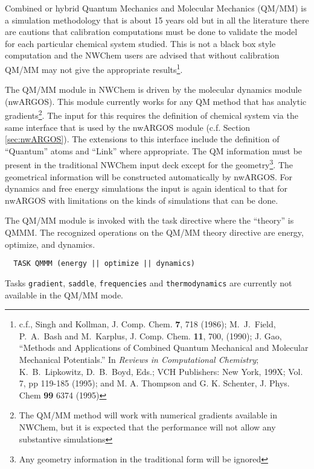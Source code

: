 
\label{sec:qmmm}

Combined or hybrid Quantum Mechanics and Molecular Mechanics (QM/MM)
is a simulation methodology that is about 15 years old but in all the
literature there are cautions that calibration computations must be
done to validate the model for each particular chemical system
studied.  This is not a black box style computation and the NWChem
users are advised that without calibration QM/MM may not give the
appropriate results\footnote{c.f., Singh and Kollman, J. Comp. Chem.
  {\bf 7}, 718 (1986); M.~J.~Field, P.~A.~Bash and M.~Karplus, J.
  Comp. Chem. {\bf 11}, 700, (1990); J. Gao, ``Methods and
  Applications of Combined Quantum Mechanical and Molecular Mechanical
  Potentials.'' In {\it Reviews in Computational Chemistry};
  K.~B.~Lipkowitz, D.~B.~Boyd, Eds.; VCH Publishers: New York, 199X;
  Vol. 7, pp 119-185 (1995); and M. A. Thompson and G. K. Schenter, J.
  Phys. Chem {\bf 99} 6374 (1995) }.

The QM/MM module in NWChem is driven by the molecular dynamics module
(nwARGOS).  This module currently works for any QM method that has
analytic gradients\footnote{The QM/MM method will work with numerical
  gradients available in NWChem, but it is expected that the
  performance will not allow any substantive simulations}.  The input
for this requires the definition of chemical system via the same
interface that is used by the nwARGOS module (c.f. Section
\ref{sec:nwARGOS}).  The extensions to this interface include the
definition of ``Quantum'' atoms and ``Link'' where appropriate.  The
QM information must be present in the traditional NWChem input deck
except for the geometry\footnote{Any geometry information in the
  traditional form will be ignored}.  The geometrical information will
be constructed automatically by nwARGOS.  For dynamics and free energy
simulations the input is again identical to that for nwARGOS with
limitations on the kinds of simulations that can be done.

The QM/MM module is invoked with the task directive where the
``theory'' is QMMM.  The recognized operations on the QM/MM theory
directive are energy, optimize, and dynamics.

\begin{verbatim}
  TASK QMMM (energy || optimize || dynamics)
\end{verbatim}

Tasks \verb+gradient+, \verb+saddle+, \verb+frequencies+ and
\verb+thermodynamics+ are currently not available in the QM/MM mode.  


